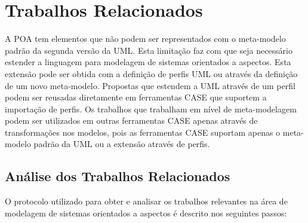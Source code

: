 \chapter{Trabalhos Relacionados}
\label{sec:trabalhos_relacionados}

A POA tem elementos que não podem ser representados com o meta-modelo padrão da segunda versão da UML. Esta limitação faz com que seja necessário
estender a linguagem para modelagem de sistemas orientados a aspectos. Esta extensão pode ser obtida com a definição de perfis UML ou através da
definição de um novo meta-modelo. Propostas que estendem a UML através de um perfil podem ser reusadas diretamente em ferramentas CASE que suportem a
importação de perfis. Os trabalhos que trabalham em nível de meta-modelagem podem ser utilizados em outras ferramentas CASE apenas através de
transformações nos modelos, pois as ferramentas CASE suportam apenas o meta-modelo padrão da UML ou a extensão através de perfis. 

\section{Análise dos Trabalhos Relacionados}

O protocolo utilizado para obter e analisar os trabalhos relevantes na área de modelagem de sistemas orientados a aspectos é descrito nos seguintes
passos:

